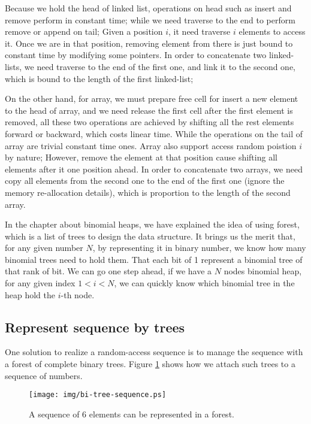 \documentclass{article}
\begin{document}
Because we hold the head of linked list, operations on head such as insert and remove perform
in constant time; while we need traverse to the end to perform remove or append on tail; Given
a position $i$, it need traverse $i$ elements to access it. Once we are in that position,
removing element from there is just bound to constant time by modifying some pointers. 
In order to concatenate two
linked-lists, we need traverse to the end of the first one, and link it to the second one, which
is bound to the length of the first linked-list;

On the other hand, for array, we must prepare free cell for insert a new element to the head of array, and
we need release the first cell after the first element is removed, all these two operations are
achieved by shifting all the rest elements forward or backward, which costs linear time. While the
operations on the tail of array are trivial constant time ones. Array also support access random
poistion $i$ by nature; However, remove the element at that position cause shifting all elements
after it one position ahead. In order to concatenate two arrays, we need copy all elements from the
second one to the end of the first one (ignore the memory re-allocation details), which is proportion
to the length of the second array.

In the chapter about binomial heaps, we have explained the idea of using forest, which is a list of trees
to design the data structure. It brings us the merit that, for any given number $N$, by representing it
in binary number, we know how many binomial trees need to hold them. That each bit of 1 represent a binomial
tree of that rank of bit. We can go one step ahead, if we have a $N$ nodes binomial heap, for any given
index $1 < i < N$, we can quickly know which binomial tree in the heap hold the $i$-th node.

\subsection{Represent sequence by trees}

One solution to realize a random-access sequence is to manage the sequence with a forest of complete binary
trees. Figure \ref{fig:bi-tree-sequence} shows how we attach such trees to a sequence of numbers.

\begin{figure}[htbp]
  \centering
  \texttt{[image: img/bi-tree-sequence.ps]}
  \caption{A sequence of 6 elements can be represented in a forest.} \label{fig:bi-tree-sequence}
\end{figure}
\end{document}
